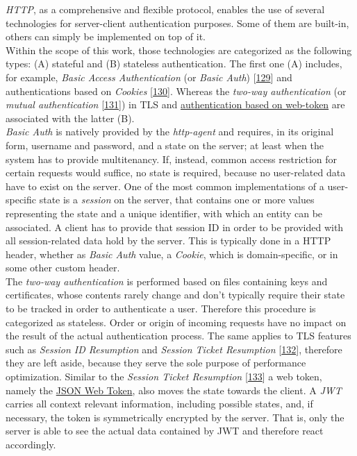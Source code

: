 \documentclass[12pt,english,a4paper,titlepage,cleardoublepage=empty,dottedtoc]{report}
\begin{document}
\emph{HTTP}, as a comprehensive and flexible protocol, enables the use
of several technologies for server-client authentication purposes. Some
of them are built-in, others can simply be implemented on top of it.\\
Within the scope of this work, those technologies are categorized as the
following types: (A) stateful and (B) stateless authentication. The
first one (A) includes, for example, \emph{Basic Access Authentication}
(or \emph{Basic Auth})
{[}\protect\hyperlink{ref-web_spec_basic-auth}{129}{]} and
authentications based on \emph{Cookies}
{[}\protect\hyperlink{ref-web_spec_cookie}{130}{]}. Whereas the
\emph{two-way authentication} (or \emph{mutual authentication}
{[}\protect\hyperlink{ref-web_2017_wikipedia_mutual-auth}{131}{]}) in
TLS and \protect\hyperlink{def--jwt}{authentication based on web-token}
are associated with the latter (B).\\
\emph{Basic Auth} is natively provided by the \emph{http-agent} and
requires, in its original form, username and password, and a state on
the server; at least when the system has to provide multitenancy. If,
instead, common access restriction for certain requests would suffice,
no state is required, because no user-related data have to exist on the
server. One of the most common implementations of a user-specific state
is a \emph{session} on the server, that contains one or more values
representing the state and a unique identifier, with which an entity can
be associated. A client has to provide that session ID in order to be
provided with all session-related data hold by the server. This is
typically done in a HTTP header, whether as \emph{Basic Auth} value, a
\emph{Cookie}, which is domain-specific, or in some other custom
header.\\
The \emph{two-way authentication} is performed based on files containing
keys and certificates, whose contents rarely change and don't typically
require their state to be tracked in order to authenticate a user.
Therefore this procedure is categorized as stateless. Order or origin of
incoming requests have no impact on the result of the actual
authentication process. The same applies to TLS features such as
\emph{Session ID Resumption} and \emph{Session Ticket Resumption}
{[}\protect\hyperlink{ref-book_2013_networking-101_tls-session-resumption}{132}{]},
therefore they are left aside, because they serve the sole purpose of
performance optimization. Similar to the \emph{Session Ticket
Resumption}
{[}\protect\hyperlink{ref-web_spec_tls-session-ticket-resumption}{133}{]}
a web token, namely the \protect\hyperlink{def--jwt}{JSON Web Token},
also moves the state towards the client. A \emph{JWT} carries all
context relevant information, including possible states, and, if
necessary, the token is symmetrically encrypted by the server. That is,
only the server is able to see the actual data contained by JWT and
therefore react accordingly.
\end{document}
